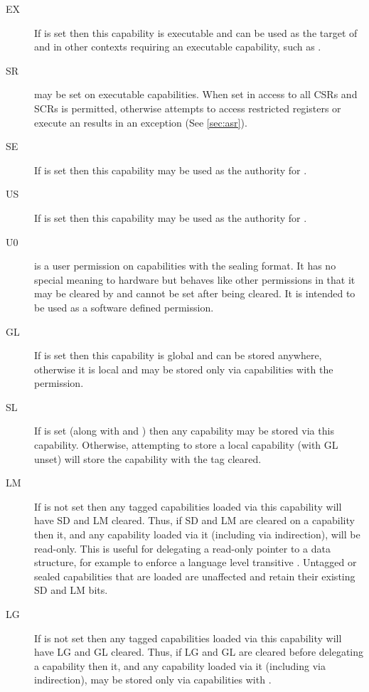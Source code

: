 \begin{description}
\item[EX] If \cappermX is set then this capability is executable and can be used as the target of  and in other contexts requiring an executable capability, such as .
\item[SR] \cappermASR{} may be set on executable capabilities.
When set in \PCC{} access to all CSRs and SCRs is permitted, otherwise attempts to access restricted registers or execute an  results in an exception (See \cref{sec:asr}).
\item[SE] If \cappermSeal is set then this capability may be used as the authority for .
\item[US] If \cappermUnseal is set then this capability may be used as the authority for .
\item[U0] \cappermUZ is a user permission on capabilities with the sealing format.
It has no special meaning to hardware but behaves like other permissions in that it may be cleared by  and cannot be set after being cleared.
It is intended to be used as a software defined permission.
\item[GL] If \cappermG is set then this capability is global and can be stored anywhere, otherwise it is local and may be stored only via capabilities with the \cappermSLC permission.
\item[SL] If \cappermSLC is set (along with \cappermS and \cappermMC) then any capability may be stored via this capability.
Otherwise, attempting to store a local capability (with GL unset) will store the capability with the tag cleared.
\item[LM] If \cappermLM is not set then any tagged capabilities loaded via this capability will have SD and LM cleared.
Thus, if SD and LM are cleared on a capability then it, and any capability loaded via it (including via indirection), will be read-only.
This is useful for delegating a read-only pointer to a data structure, for example to enforce a language level transitive .
Untagged or sealed capabilities that are loaded are unaffected and retain their existing SD and LM bits.
\item[LG] If \cappermILG is not set then any tagged capabilities loaded via this capability will have LG and GL cleared.
Thus, if LG and GL are cleared before delegating a capability then it, and any capability loaded via it (including via indirection), may be stored only via capabilities with \cappermSLC.

\end{description}
